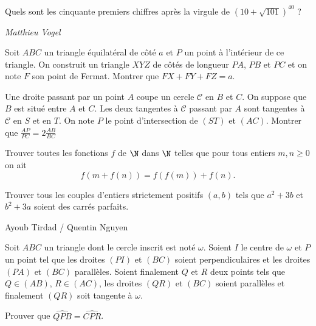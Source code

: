 \begin{exo}{}
Quels sont les cinquante premiers chiffres après la virgule de $(10+\sqrt{101})^{40}$ ?


\medskip
\textit{Matthieu Vogel}
\end{exo}

\begin{exo}{}
Soit $ABC$ un triangle équilatéral de côté $a$ et $P$ un point à l'intérieur de ce triangle. On construit un triangle $XYZ$ de côtés de longueur $PA$, $PB$ et $PC$ et on note $F$ son point de Fermat. Montrer que $FX+FY+FZ=a$.
\end{exo}

\begin{exo}{}
Une droite passant par un point $A$ coupe un cercle $ \mathcal{C}$ en $B$ et $C$. On suppose que $B$ est situé entre $A$ et $C$. Les deux tangentes à $ \mathcal{C}$ passant par $A$ sont tangentes à $ \mathcal{C}$ en $S$ et en $T$. On note $P$ le point d'intersection de $(ST)$ et $(AC)$. Montrer que
$ \frac{AP}{PC}=2\frac{AB}{BC} $

\end{exo}

\begin{exo}{}Trouver toutes les fonctions $f$ de $ \N$ dans $ \N$ telles que pour tous entiers $m,n \geq 0$ on ait
$$f(m+f(n))=f(f(m))+f(n).$$
\end{exo}

\begin{exo}{}
Trouver tous les couples d'entiers strictement positifs $(a,b)$ tels que $a^2+3b$ et $b^2+3a$ soient des carrés parfaits.

Ayoub Tirdad / Quentin Nguyen
\end{exo}



\begin{exo}{}
Soit $ABC$ un triangle dont le cercle inscrit est noté $ \omega$. Soient $I$ le centre de $ \omega$ et $P$ un point tel que les droites $(PI)$ et $(BC)$ soient perpendiculaires et les droites $(PA)$ et $(BC)$ parallèles. Soient finalement $Q$ et $R$ deux points tels que $Q \in (AB)$, $R \in (AC)$, les droites $(QR)$ et $(BC)$ soient parallèles et finalement $(QR)$ soit tangente à $ \omega$.

Prouver que $ \widehat {QPB}= \widehat {CPR}$.
\end{exo}

